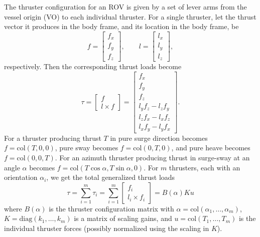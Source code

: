 \documentclass[a4paper,twoside,english]{report}
\begin{document}
The thruster configuration for an ROV is given by a set of lever arms
from the vessel origin (VO) to each individual thruster. For a single
thruster, let the thrust vector it produces in the body frame, and
its location in the body frame, be
\begin{equation}
f=\left[\begin{array}{c}
f_{x}\\
f_{y}\\
f_{z}
\end{array}\right],\qquad l=\left[\begin{array}{c}
l_{x}\\
l_{y}\\
l_{z}
\end{array}\right],
\end{equation}
respectively. Then the corresponding thrust loads become 
\begin{equation}
\tau=\left[\begin{array}{c}
f\\
l\times f
\end{array}\right]=\left[\begin{array}{c}
f_{x}\\
f_{y}\\
f_{z}\\
l_{y}f_{z}-l_{z}f_{y}\\
l_{z}f_{x}-l_{x}f_{z}\\
l_{x}f_{y}-l_{y}f_{x}
\end{array}\right].
\end{equation}
For a thruster producing thrust $T$ in pure surge direction becomes
$f=\text{col}(T,0,0)$, pure sway becomes $f=\text{col}(0,T,0)$,
and pure heave becomes $f=\text{col}(0,0,T)$. For an azimuth thruster
producing thrust in surge-sway at an angle $\alpha$ becomes $f=\text{col}(T\cos\alpha,T\sin\alpha,0)$.
For $m$ thrusters, each with an orientation $\alpha_{i}$, we get
the total generalized thrust loads 
\begin{equation}
\tau=\sum_{i=1}^{m}\tau_{i}=\sum_{i=1}^{m}\left[\begin{array}{c}
f_{i}\\
l_{i}\times f_{i}
\end{array}\right]=B(\alpha)Ku
\end{equation}
where $B(\alpha)$ is the thruster configuration matrix with $\alpha=\text{col}(\alpha_{1},\ldots,\alpha_{m})$,
$K=\text{diag}(k_{1},\ldots,k_{m})$ is a matrix of scaling gains,
and $u=\text{col}(T_{1},\ldots,T_{m})$ is the individual thruster
forces (possibly normalized using the scaling in $K$).
\end{document}
